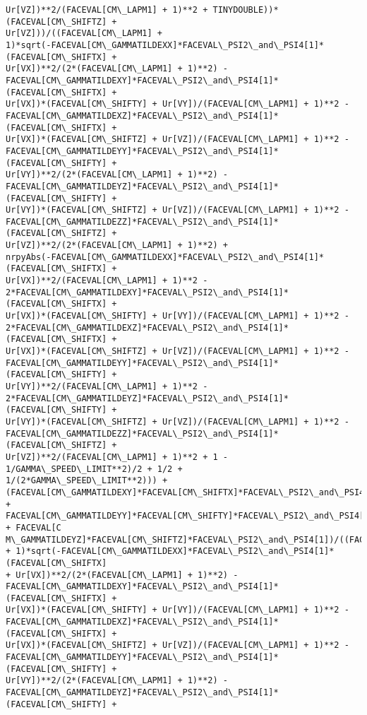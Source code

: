 \documentclass[landscape,letterpaper,10pt,english]{article}
\begin{document}
\begin{Verbatim}[commandchars=\\\{\}]
Ur[VZ])**2/(FACEVAL[CM\_LAPM1] + 1)**2 + TINYDOUBLE))*(FACEVAL[CM\_SHIFTZ] +
Ur[VZ]))/((FACEVAL[CM\_LAPM1] +
1)*sqrt(-FACEVAL[CM\_GAMMATILDEXX]*FACEVAL\_PSI2\_and\_PSI4[1]*(FACEVAL[CM\_SHIFTX] +
Ur[VX])**2/(2*(FACEVAL[CM\_LAPM1] + 1)**2) -
FACEVAL[CM\_GAMMATILDEXY]*FACEVAL\_PSI2\_and\_PSI4[1]*(FACEVAL[CM\_SHIFTX] +
Ur[VX])*(FACEVAL[CM\_SHIFTY] + Ur[VY])/(FACEVAL[CM\_LAPM1] + 1)**2 -
FACEVAL[CM\_GAMMATILDEXZ]*FACEVAL\_PSI2\_and\_PSI4[1]*(FACEVAL[CM\_SHIFTX] +
Ur[VX])*(FACEVAL[CM\_SHIFTZ] + Ur[VZ])/(FACEVAL[CM\_LAPM1] + 1)**2 -
FACEVAL[CM\_GAMMATILDEYY]*FACEVAL\_PSI2\_and\_PSI4[1]*(FACEVAL[CM\_SHIFTY] +
Ur[VY])**2/(2*(FACEVAL[CM\_LAPM1] + 1)**2) -
FACEVAL[CM\_GAMMATILDEYZ]*FACEVAL\_PSI2\_and\_PSI4[1]*(FACEVAL[CM\_SHIFTY] +
Ur[VY])*(FACEVAL[CM\_SHIFTZ] + Ur[VZ])/(FACEVAL[CM\_LAPM1] + 1)**2 -
FACEVAL[CM\_GAMMATILDEZZ]*FACEVAL\_PSI2\_and\_PSI4[1]*(FACEVAL[CM\_SHIFTZ] +
Ur[VZ])**2/(2*(FACEVAL[CM\_LAPM1] + 1)**2) +
nrpyAbs(-FACEVAL[CM\_GAMMATILDEXX]*FACEVAL\_PSI2\_and\_PSI4[1]*(FACEVAL[CM\_SHIFTX] +
Ur[VX])**2/(FACEVAL[CM\_LAPM1] + 1)**2 -
2*FACEVAL[CM\_GAMMATILDEXY]*FACEVAL\_PSI2\_and\_PSI4[1]*(FACEVAL[CM\_SHIFTX] +
Ur[VX])*(FACEVAL[CM\_SHIFTY] + Ur[VY])/(FACEVAL[CM\_LAPM1] + 1)**2 -
2*FACEVAL[CM\_GAMMATILDEXZ]*FACEVAL\_PSI2\_and\_PSI4[1]*(FACEVAL[CM\_SHIFTX] +
Ur[VX])*(FACEVAL[CM\_SHIFTZ] + Ur[VZ])/(FACEVAL[CM\_LAPM1] + 1)**2 -
FACEVAL[CM\_GAMMATILDEYY]*FACEVAL\_PSI2\_and\_PSI4[1]*(FACEVAL[CM\_SHIFTY] +
Ur[VY])**2/(FACEVAL[CM\_LAPM1] + 1)**2 -
2*FACEVAL[CM\_GAMMATILDEYZ]*FACEVAL\_PSI2\_and\_PSI4[1]*(FACEVAL[CM\_SHIFTY] +
Ur[VY])*(FACEVAL[CM\_SHIFTZ] + Ur[VZ])/(FACEVAL[CM\_LAPM1] + 1)**2 -
FACEVAL[CM\_GAMMATILDEZZ]*FACEVAL\_PSI2\_and\_PSI4[1]*(FACEVAL[CM\_SHIFTZ] +
Ur[VZ])**2/(FACEVAL[CM\_LAPM1] + 1)**2 + 1 - 1/GAMMA\_SPEED\_LIMIT**2)/2 + 1/2 +
1/(2*GAMMA\_SPEED\_LIMIT**2))) +
(FACEVAL[CM\_GAMMATILDEXY]*FACEVAL[CM\_SHIFTX]*FACEVAL\_PSI2\_and\_PSI4[1] +
FACEVAL[CM\_GAMMATILDEYY]*FACEVAL[CM\_SHIFTY]*FACEVAL\_PSI2\_and\_PSI4[1] + FACEVAL[C
M\_GAMMATILDEYZ]*FACEVAL[CM\_SHIFTZ]*FACEVAL\_PSI2\_and\_PSI4[1])/((FACEVAL[CM\_LAPM1]
+ 1)*sqrt(-FACEVAL[CM\_GAMMATILDEXX]*FACEVAL\_PSI2\_and\_PSI4[1]*(FACEVAL[CM\_SHIFTX]
+ Ur[VX])**2/(2*(FACEVAL[CM\_LAPM1] + 1)**2) -
FACEVAL[CM\_GAMMATILDEXY]*FACEVAL\_PSI2\_and\_PSI4[1]*(FACEVAL[CM\_SHIFTX] +
Ur[VX])*(FACEVAL[CM\_SHIFTY] + Ur[VY])/(FACEVAL[CM\_LAPM1] + 1)**2 -
FACEVAL[CM\_GAMMATILDEXZ]*FACEVAL\_PSI2\_and\_PSI4[1]*(FACEVAL[CM\_SHIFTX] +
Ur[VX])*(FACEVAL[CM\_SHIFTZ] + Ur[VZ])/(FACEVAL[CM\_LAPM1] + 1)**2 -
FACEVAL[CM\_GAMMATILDEYY]*FACEVAL\_PSI2\_and\_PSI4[1]*(FACEVAL[CM\_SHIFTY] +
Ur[VY])**2/(2*(FACEVAL[CM\_LAPM1] + 1)**2) -
FACEVAL[CM\_GAMMATILDEYZ]*FACEVAL\_PSI2\_and\_PSI4[1]*(FACEVAL[CM\_SHIFTY] +

\end{Verbatim}
\end{document}
